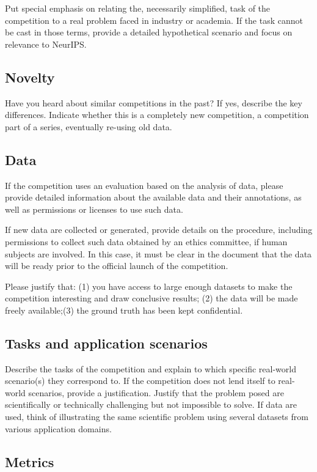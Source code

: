\documentclass[11pt, oneside]{article}
\begin{document}
Put special emphasis on relating the, necessarily simplified, task of the competition to a real problem faced in industry or academia. If the task cannot be cast in those terms, provide a detailed hypothetical scenario and focus on relevance to NeurIPS.


\subsection{Novelty}

Have you heard about similar competitions in the past? If yes, describe the key differences.
Indicate whether this is a completely new competition, a competition part of a series, eventually re-using old data.

\subsection{Data}

If the competition uses an evaluation based on the analysis of data,
please provide detailed information about the available data and
their annotations, as well as permissions or licenses to use such data.

If new data are collected or generated, provide details on the procedure, including permissions to collect such data obtained by an ethics committee, if human subjects are involved. In this case, it must be clear in the document that the data will be ready prior to the official launch of the
competition. 

Please justify that: (1) you have access to large
enough datasets to make the competition interesting and draw
conclusive
 results; (2) the data will be made freely available;(3) the ground truth has been kept confidential.

\subsection{Tasks and application scenarios}

Describe the tasks of the competition and explain to which specific real-world scenario(s) they correspond to. If the competition does not lend itself
to real-world scenarios, provide a justification. Justify that the problem posed are scientifically or technically challenging but not impossible to
solve. If data are used, think of illustrating the same scientific problem using several datasets from various application domains.


\subsection{Metrics}
\end{document}
